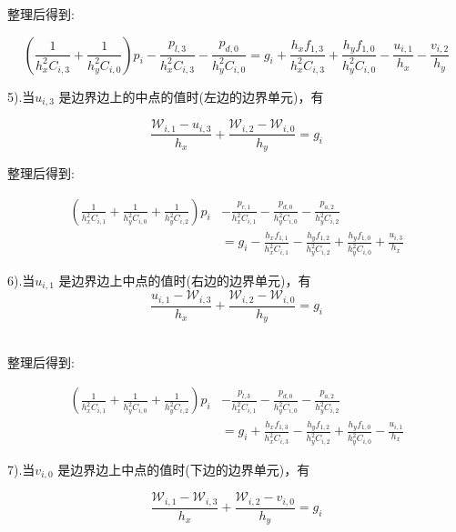 \documentclass[leqno]{article}
\begin{document}
整理后得到:

\begin{equation*}
(\frac{1}{h_x^2C_{i,3}} + \frac{1}{h_y^2C_{i,0}})p_i - \frac{p_{l,3}}{h_x^2C_{i,3}} - \frac{p_{d,0}}{h_y^2C_{i,0}} = g_i + \frac{h_xf_{1,3}}{h_x^2C_{i,3}} + \frac{h_yf_{1,0}}{h_y^2C_{i,0}} - \frac{u_{i,1}}{h_x} - \frac{v_{i,2}}{h_y}
\end{equation*}

5).当$u_{i,3}$ 是边界边上的中点的值时(左边的边界单元)，有

\begin{equation*}
\frac{\mathcal{W}_{i,1} - u_{i,3}}{h_x} + \frac{\mathcal{W}_{i,2} - \mathcal{W}_{i,0}}{h_y} = g_i
\end{equation*}

整理后得到:

\begin{equation*}
\begin{aligned}
(\frac{1}{h_x^2C_{i,1}} + \frac{1}{h_y^2C_{i,0}} + \frac{1}{h_y^2C_{i,2}})p_i & - \frac{p_{r,1}}{h_x^2C_{i,1}} - \frac{p_{d,0}}{h_y^2C_{i,0}} - \frac{p_{a,2}}{h_y^2C_{i,2}} \\
& = g_i - \frac{h_xf_{1,1}}{h_x^2C_{i,1}} - \frac{h_yf_{1,2}}{h_y^2C_{i,2}} + \frac{h_yf_{1,0}}{h_y^2C_{i,0}} + \frac{u_{i,3}}{h_x}
\end{aligned}
\end{equation*}

6).当$u_{i,1}$ 是边界边上中点的值时(右边的边界单元)，有
\begin{equation*}
\frac{ u_{i,1} - \mathcal{W}_{i,3}}{h_x} + \frac{ \mathcal{W}_{i,2} - \mathcal{W}_{i,0}}{h_y} = g_i
\end{equation*}　

整理后得到:

\begin{equation*}
\begin{aligned}
(\frac{1}{h_x^2C_{i,1}} + \frac{1}{h_y^2C_{i,0}} + \frac{1}{h_y^2C_{i,2}})p_i & - \frac{p_{l,3}}{h_x^2C_{i,1}} - \frac{p_{d,0}}{h_y^2C_{i,0}} - \frac{p_{a,2}}{h_y^2C_{i,2}} \\
& =  g_i + \frac{h_xf_{1,3}}{h_x^2C_{i,3}} - \frac{h_yf_{1,2}}{h_y^2C_{i,2}} + \frac{h_yf_{1,0}}{h_y^2C_{i,0}} - \frac{u_{i,1}}{h_x}
\end{aligned}
\end{equation*}

7).当$v_{i,0}$ 是边界边上中点的值时(下边的边界单元)，有

\begin{equation*}
\frac{ \mathcal{W}_{i,1} - \mathcal{W}_{i,3}}{h_x} + \frac{\mathcal{W}_{i,2}- v_{i,0}}{h_y} = g_i
\end{equation*}　
\end{document}
